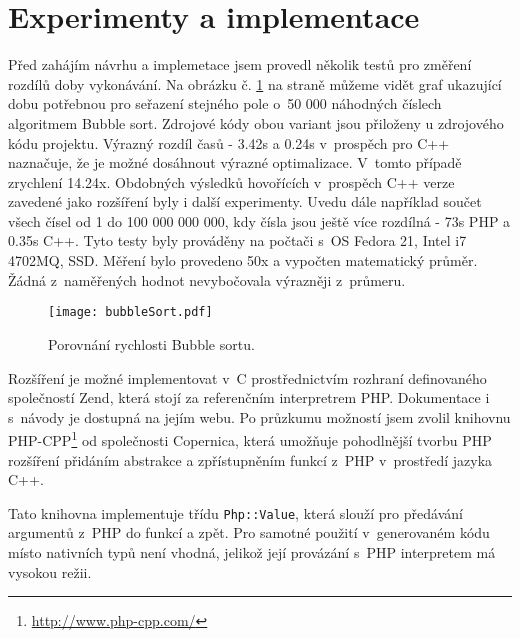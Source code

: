 \documentclass[czech]{ExcelAtFIT}
\newcommand{\function}[1]{\texttt{#1}}
\begin{document}
\section{Experimenty a implementace}

	Před zahájím návrhu a implemetace jsem provedl několik testů pro změření rozdílů doby vykonávání. Na obrázku č. \ref{fig:bubbleSort} na straně \pageref{fig:bubbleSort} můžeme vidět graf ukazující dobu potřebnou pro seřazení stejného pole o~50 000 náhodných číslech algoritmem Bubble sort. Zdrojové kódy obou variant jsou přiloženy u zdrojového kódu projektu. Výrazný rozdíl časů - 3.42s a 0.24s v~prospěch pro C++ naznačuje, že je možné dosáhnout výrazné optimalizace. V~tomto případě zrychlení 14.24x. Obdobných výsledků hovořících v~prospěch C++ verze zavedené jako rozšíření byly i další experimenty. Uvedu dále například součet všech čísel od 1 do 100 000 000 000, kdy čísla jsou ještě více rozdílná - 73s PHP a 0.35s C++. Tyto testy byly prováděny na počtači s~OS Fedora 21, Intel i7 4702MQ, SSD. Měření bylo provedeno 50x a vypočten matematický průměr. Žádná z~naměřených hodnot nevybočovala výrazněji z~průmeru.


\begin{figure}[t]
	\centering
	\texttt{[image: bubbleSort.pdf]}
	\caption{Porovnání rychlosti Bubble sortu.}
	\label{fig:bubbleSort}
\end{figure}

	Rozšíření je možné implementovat v~C prostřednictvím rozhraní definovaného společností Zend, která stojí za referenčním interpretrem PHP. Dokumentace i s~návody je dostupná na jejím webu. Po průzkumu možností jsem zvolil knihovnu PHP-CPP\footnote{\url{http://www.php-cpp.com/}} od společnosti Copernica, která umožňuje pohodlnější tvorbu PHP rozšíření přidáním abstrakce a zpřístupněním funkcí z~PHP v~prostředí jazyka C++.

	Tato knihovna implementuje třídu \function{Php::Value}, která slouží pro předávání argumentů z~PHP do funkcí a zpět. Pro samotné použití v~generovaném kódu místo nativních typů není vhodná, jelikož její provázání s~PHP interpretem má vysokou režii.
\end{document}
